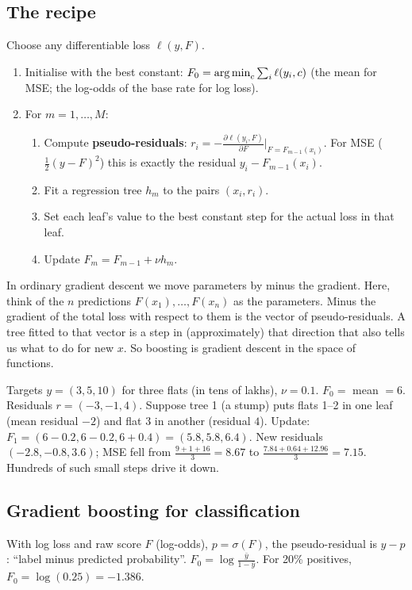 \subsection{The recipe}
Choose any differentiable loss $\ell(y, F)$.
\begin{enumerate}
\item Initialise with the best constant: $F_0 = \operatorname*{arg\,min}_c\sum_i\ell(y_i, c)$ (the mean for MSE; the log-odds of the base rate for
  log loss).
\item For $m = 1,\dots,M$:
  \begin{enumerate}
  \item Compute \textbf{pseudo-residuals}: $r_i = -\frac{\partial\ell(y_i,F)}{\partial F}\Big|_{F = F_{m-1}(x_i)}$.
    For MSE ($\frac12(y-F)^2$) this is exactly the residual $y_i - F_{m-1}(x_i)$.
  \item Fit a regression tree $h_m$ to the pairs $(x_i, r_i)$.
  \item Set each leaf's value to the best constant step for the actual loss in that leaf.
  \item Update $F_m = F_{m-1} + \nu h_m$.
  \end{enumerate}
\end{enumerate}

\begin{intuition}
In ordinary gradient descent we move parameters by minus the gradient. Here, think of the $n$ predictions $F(x_1),\dots,F(x_n)$ as
the parameters. Minus the gradient of the total loss with respect to them is the vector of pseudo-residuals. A tree fitted to that
vector is a step in (approximately) that direction that also tells us what to do for new $x$. So boosting is gradient descent in the
space of functions.
\end{intuition}

\begin{example}
Targets $y = (3, 5, 10)$ for three flats (in tens of lakhs), $\nu = 0.1$.
$F_0 = $ mean $= 6$. Residuals $r = (-3, -1, 4)$.
Suppose tree 1 (a stump) puts flats 1--2 in one leaf (mean residual $-2$) and flat 3 in another (residual $4$). Update:
$F_1 = (6 - 0.2, 6 - 0.2, 6 + 0.4) = (5.8, 5.8, 6.4)$. New residuals $(-2.8, -0.8, 3.6)$; MSE fell from $\frac{9+1+16}{3} = 8.67$ to
$\frac{7.84 + 0.64 + 12.96}{3} = 7.15$. Hundreds of such small steps drive it down.
\end{example}

\subsection{Gradient boosting for classification}
With log loss and raw score $F$ (log-odds), $p = \sigma(F)$, the pseudo-residual is $y - p$: ``label minus predicted probability''.
$F_0 = \log\frac{\bar y}{1-\bar y}$. For 20\% positives, $F_0 = \log(0.25) = -1.386$.

